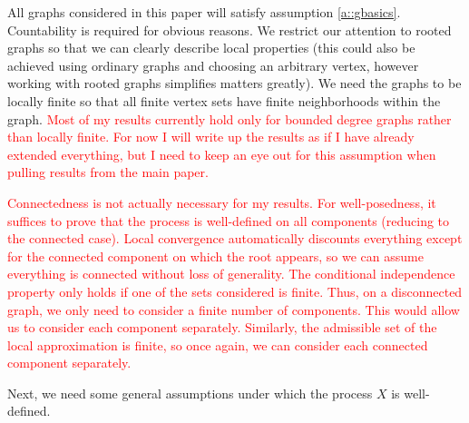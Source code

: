\documentclass[12pt]{article}
\newcommand{\tr}{\textcolor{red}}
\newcommand{\ind}{\hspace{24pt}}
\newcommand{\Xf}{X}									%
\begin{document}
All graphs considered in this paper will satisfy assumption \ref{a::gbasics}. Countability is required for obvious reasons. We restrict our attention to rooted graphs so that we can clearly describe local properties (this could also be achieved using ordinary graphs and choosing an arbitrary vertex, however working with rooted graphs simplifies matters greatly). We need the graphs to be locally finite so that all finite vertex sets have finite neighborhoods within the graph. \tr{Most of my results currently hold only for bounded degree graphs rather than locally finite. For now I will write up the results as if I have already extended everything, but I need to keep an eye out for this assumption when pulling results from the main paper.}

\ind \tr{Connectedness is not actually necessary for my results. For well-posedness, it suffices to prove that the process is well-defined on all components (reducing to the connected case). Local convergence automatically discounts everything except for the connected component on which the root appears, so we can assume everything is connected without loss of generality. The conditional independence property only holds if one of the sets considered is finite. Thus, on a disconnected graph, we only need to consider a finite number of components. This would allow us to consider each component separately. Similarly, the admissible set of the local approximation is finite, so once again, we can consider each connected component separately.}

\ind Next, we need some general assumptions under which the process \(\Xf\) is well-defined.
\end{document}

